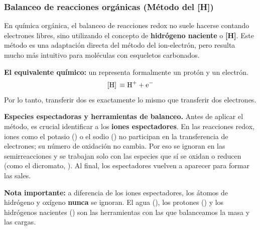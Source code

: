 {}
\subsubsection*{\textcolor{blueunam}{Balanceo de reacciones orgánicas (Método del [H])}}

En química orgánica, el balanceo de reacciones redox no suele hacerse contando electrones libres, sino utilizando el concepto de \textbf{hidrógeno naciente} o \textbf{[H]}. Este método es una adaptación directa del método del ion-electrón, pero resulta mucho más intuitivo para moléculas con esqueletos carbonados.

\textbf{El equivalente químico:} un \ce{[H]} representa formalmente un protón y un electrón.
\[
\ce{[H] \equiv H+ + e-}
\]
Por lo tanto, transferir dos \ce{[H]} es exactamente lo mismo que transferir dos electrones.

\textbf{Especies espectadoras y herramientas de balanceo.}
Antes de aplicar el método, es crucial identificar a los \textbf{iones espectadores}. En las reacciones redox, iones como el potasio () o el sodio () no participan en la transferencia de electrones; su número de oxidación no cambia. Por eso se ignoran en las semirreacciones y se trabajan solo con las especies que sí se oxidan o reducen (como el dicromato, ). Al final, los espectadores vuelven a aparecer para formar las sales.

\textbf{Nota importante:} a diferencia de los iones espectadores, los átomos de hidrógeno y oxígeno \textbf{nunca} se ignoran. El agua (), los protones () y los hidrógenos nacientes (\ce{[H]}) son las herramientas con las que balanceamos la masa y las cargas.

